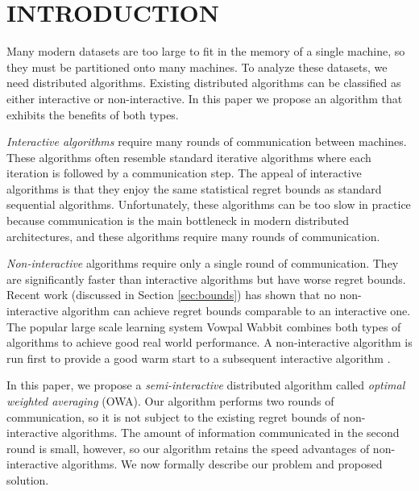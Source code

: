 \documentclass[twoside]{article}
\begin{document}



\section{INTRODUCTION}

Many modern datasets are too large to fit in the memory of a single machine,
so they must be partitioned onto many machines.
To analyze these datasets, we need distributed algorithms.
Existing distributed algorithms can be classified as either interactive or non-interactive.
In this paper we propose an algorithm that exhibits the benefits of both types.

\emph{Interactive algorithms} require many rounds of communication between machines.
These algorithms often resemble standard iterative algorithms where each iteration is followed by a communication step.
The appeal of interactive algorithms is that they enjoy the same statistical regret bounds as standard sequential algorithms.
Unfortunately, these algorithms can be too slow in practice because communication is the main bottleneck in modern distributed architectures,
and these algorithms require many rounds of communication.

\emph{Non-interactive} algorithms require only a single round of communication.
They are significantly faster than interactive algorithms
but have worse regret bounds.
Recent work (discussed in Section \ref{sec:bounds}) has shown that no non-interactive algorithm can achieve regret bounds comparable to an interactive one.
The popular large scale learning system Vowpal Wabbit combines both types of algorithms to achieve good real world performance.
A non-interactive algorithm is run first to provide a good warm start to a subsequent interactive algorithm \citep{vw,agarwal2014reliable}.

In this paper, we propose a \emph{semi-interactive} distributed algorithm called \emph{optimal weighted averaging} (OWA).
Our algorithm performs two rounds of communication,
so it is not subject to the existing regret bounds of non-interactive algorithms.
The amount of information communicated in the second round is small, however,
so our algorithm retains the speed advantages of non-interactive algorithms.
We now formally describe our problem and proposed solution.
\end{document}
